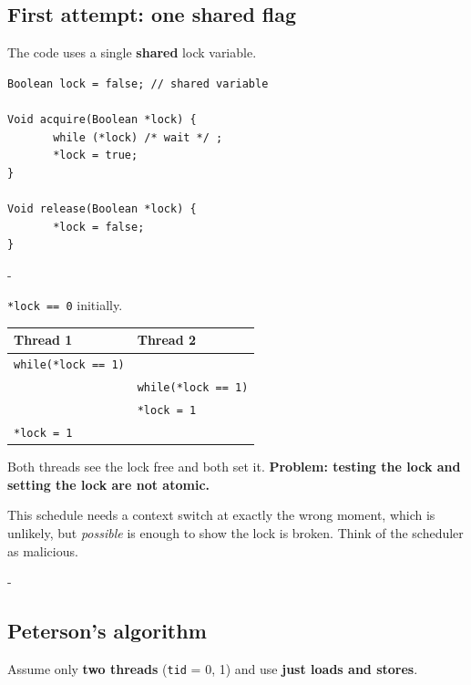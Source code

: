 \documentclass[11pt,a4paper]{article}
\makeatletter
\newcommand{\keepspace}[1]{\par\penalty-100\begingroup
  \setlength{\dimen@}{#1}\dimen@ii\pagegoal\advance\dimen@ii-\pagetotal
  \ifdim\dimen@>\dimen@ii\ifdim\dimen@ii>\z@\vfil\fi\break\fi\endgroup}
\makeatother
\begin{document}
\subsection{First attempt: one shared flag}

The code uses a single \textbf{shared} lock variable.

\begin{lstlisting}
Boolean lock = false; // shared variable

Void acquire(Boolean *lock) {
       while (*lock) /* wait */ ;
       *lock = true;
}

Void release(Boolean *lock) {
       *lock = false;
}
\end{lstlisting}

\keepspace{11\baselineskip}
\begin{quizbox}
\texttt{*lock == 0} initially.
\begin{center}
\renewcommand{\arraystretch}{1.12}
\begin{tabular}{@{}ll@{}}
  \toprule
  \textbf{Thread 1} & \textbf{Thread 2} \\
  \midrule
  \texttt{while(*lock == 1)} & \\
  & \texttt{while(*lock == 1)} \\
  & \texttt{*lock = 1} \\
  \texttt{*lock = 1} & \\
  \bottomrule
\end{tabular}
\end{center}
\end{quizbox}

\begin{warnbox}
Both threads see the lock free and both set it. \textbf{Problem: testing
the lock and setting the lock are not atomic.}

This schedule needs a context switch at exactly the wrong moment, which is
unlikely, but \emph{possible} is enough to show the lock is broken. Think
of the scheduler as malicious.
\end{warnbox}

\keepspace{16\baselineskip}
\subsection{Peterson's algorithm}

Assume only \textbf{two threads} (\texttt{tid} = 0, 1) and use \textbf{just
loads and stores}.
\end{document}
